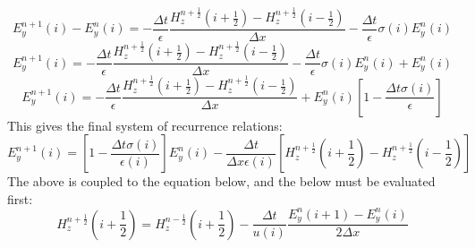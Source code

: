 \documentclass{article}
\begin{document}
            \[
                E_y^{n+1}(i) - E_y^{n}(i)
                =
                -\frac{\Delta t}{\epsilon}
                \frac{H_z^{n+\frac{1}{2}}\left( i+\frac{1}{2} \right) -H_z^{n+\frac{1}{2}}\left( i-\frac{1}{2} \right) }{\Delta x}
                -\frac{\Delta t}{\epsilon}
                \sigma(i) E_y^{n}(i)
            \]
            \[
                E_y^{n+1}(i)
                =
                -\frac{\Delta t}{\epsilon}
                \frac{H_z^{n+\frac{1}{2}}\left( i+\frac{1}{2} \right) -H_z^{n+\frac{1}{2}}\left( i-\frac{1}{2} \right) }{\Delta x}
                -\frac{\Delta t}{\epsilon}
                \sigma(i) E_y^{n}(i)
                +
                E_y^{n}(i)
            \]
            \[
                E_y^{n+1}(i)
                =
                -\frac{\Delta t}{\epsilon}
                \frac{H_z^{n+\frac{1}{2}}\left( i+\frac{1}{2} \right) -H_z^{n+\frac{1}{2}}\left( i-\frac{1}{2} \right) }{\Delta x}
                +
                E_y^{n}(i)
                \left[
                    1
                    -
                    \frac{\Delta t\sigma(i)}{\epsilon}
                \right]
            \]
            This gives the final system of recurrence relations:
            \begin{equation}
                E_y^{n+1}(i)
                =
                \left[
                    1
                    -
                    \frac{\Delta t\sigma(i)}{\epsilon(i)}
                \right]
                E_y^{n}(i)
                -
                \frac{\Delta t}{\Delta x\epsilon(i)}
                \left[
                    H_z^{n+\frac{1}{2}}\left( i+\frac{1}{2} \right) -H_z^{n+\frac{1}{2}}\left( i-\frac{1}{2} \right)
                \right]
            \end{equation}
            The above is coupled to the equation below, and the below must be evaluated first:
            \begin{equation}
                H_z^{n+\frac{1}{2}}\left(i+ \frac{1}{2} \right)
                =
                H_z^{n-\frac{1}{2}}\left(i+ \frac{1}{2} \right)
                -\frac{\Delta t}{u(i)}
                \frac{E_y^n(i+1)-E_y^n(i)}{2\Delta x}
            \end{equation}
            
\end{document}
